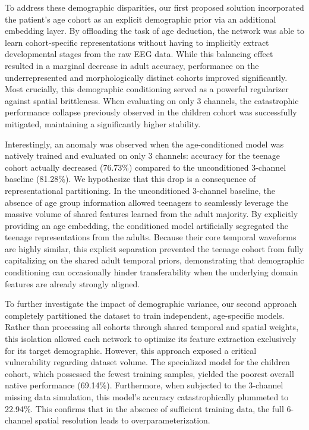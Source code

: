 To address these demographic disparities, our first proposed solution 
incorporated the patient's age cohort as an explicit demographic prior 
via an additional embedding layer. By offloading the task of age deduction,
the network was able to learn cohort-specific representations without having
to implicitly extract developmental stages from the raw EEG data. 
While this balancing effect resulted in a marginal decrease in adult accuracy,
performance on the underrepresented and morphologically distinct cohorts improved significantly.
Most crucially, this demographic conditioning served as a powerful 
regularizer against spatial brittleness. When evaluating on only 3 channels,
the catastrophic performance collapse previously observed in the children cohort
was successfully mitigated, maintaining a significantly higher stability.

Interestingly, an anomaly was observed when the age-conditioned model
was natively trained and evaluated on only 3 channels: accuracy for 
the teenage cohort actually decreased (76.73\%) compared to the 
unconditioned 3-channel baseline (81.28\%). We hypothesize that this 
drop is a consequence of representational partitioning. In the unconditioned 
3-channel baseline, the absence of age group information allowed teenagers 
to seamlessly leverage the massive volume of shared features learned from the 
adult majority. By explicitly providing an age embedding, the conditioned model 
artificially segregated the teenage representations from the adults. 
Because their core temporal waveforms are highly similar, this 
explicit separation prevented the teenage cohort from fully capitalizing
on the shared adult temporal priors, demonstrating that demographic conditioning 
can occasionally hinder transferability when the underlying domain features are 
already strongly aligned.

To further investigate the impact of demographic variance, our second approach
completely partitioned the dataset to train independent, age-specific models.
Rather than processing all cohorts through shared temporal and spatial weights,
this isolation allowed each network to optimize its feature extraction exclusively
for its target demographic. However, this approach exposed a critical vulnerability
regarding dataset volume. The specialized model for the children cohort, which
possessed the fewest training samples, yielded the poorest overall native
performance (69.14\%). Furthermore, when subjected to the 3-channel missing data
simulation, this model's accuracy catastrophically plummeted to 22.94\%. This
confirms that in the absence of sufficient training data, the full 6-channel
spatial resolution leads to overparameterization.

